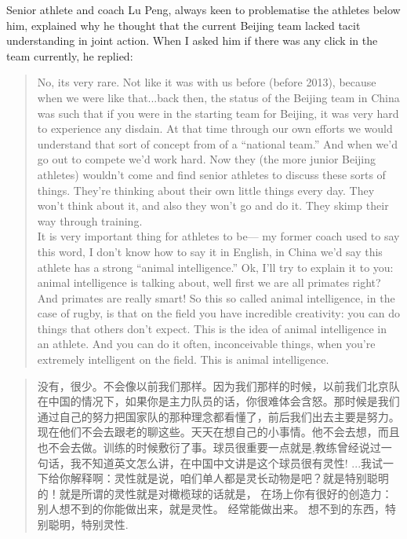 \begin{CJK}{UTF8}{gbsn}
Senior athlete and coach Lu Peng, always keen to problematise the athletes below him, explained why he thought that the current Beijing team lacked tacit understanding in joint action.  When I asked him if there was any click in the team currently, he replied:

      \begin{quote}
        No, its very rare.  Not like it was with us before (before 2013), because when we were like that...back then, the status of the Beijing team in China was such that if you were in the starting team for Beijing, it was very hard to experience any disdain.  At that time through our own efforts we would understand that sort of concept from of a ``national team.'' And when we'd go out to compete we'd work hard.  Now they (the more junior Beijing athletes) wouldn't come and find senior athletes to discuss these sorts of things.  They're thinking about their own little things every day.  They won't think about it, and also they won't go and do it.  They skimp their way through training.  \\

        It is very important thing for athletes to be--- my former coach used to say this word, I don't know how to say it in English, in China we'd say this athlete has a strong ``animal intelligence.'' Ok, I'll try to explain it to you: animal intelligence is talking about, well first we are all primates right?  And primates are really smart!  So this so called animal intelligence, in the case of rugby, is that on the field you have incredible creativity: you can do things that others don't expect.  This is the idea of animal intelligence in an athlete.  And you can do it often, inconceivable things, when you're extremely intelligent on the field. This is animal intelligence.
      \end{quote}

      \begin{quote}
        没有，很少。不会像以前我们那样。因为我们那样的时候，以前我们北京队在中国的情况下，如果你是主力队员的话，你很难体会含怒。那时候是我们通过自己的努力把国家队的那种理念都看懂了，前后我们出去主要是努力。现在他们不会去跟老的聊这些。天天在想自己的小事情。他不会去想，而且也不会去做。训练的时候敷衍了事。球员很重要一点就是,教练曾经说过一句话，我不知道英文怎么讲，在中国中文讲是这个球员很有灵性! ...我试一下给你解释啊：灵性就是说，咱们单人都是灵长动物是吧？就是特别聪明的！就是所谓的灵性就是对橄榄球的话就是， 在场上你有很好的创造力：别人想不到的你能做出来，就是灵性。 经常能做出来。 想不到的东西，特别聪明，特别灵性.
      \end{quote}


\end{CJK}
